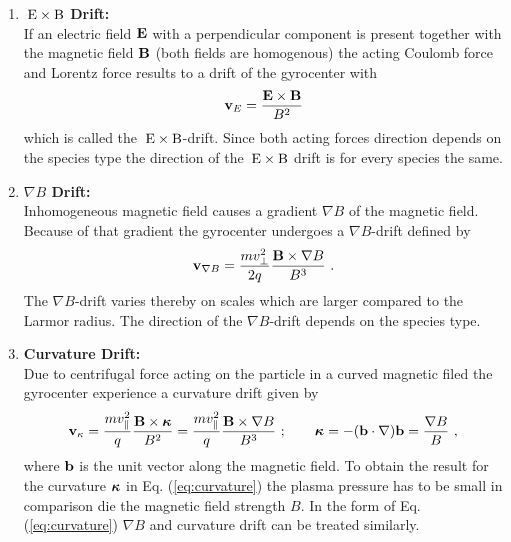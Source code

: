 \begin{enumerate}
    \item \textbf{$\mathrm{\:E}\times\mathrm{B}$ Drift:}\\
    If an electric field $\boldsymbol{\mathbf{E}}$ with a perpendicular component is present together with the magnetic field $\boldsymbol{\mathbf{B}}$ (both fields are homogenous) the acting Coulomb force and Lorentz force results to a drift of the gyrocenter with
    \begin{gather}
        \boldsymbol{\mathbf{v}}_{E} = \frac{\boldsymbol{\mathbf{E}}\times\boldsymbol{\mathbf{B}}}{B^2}
        \label{eq:exb}
    \end{gather}
    which is called the $\mathrm{\:E}\times\mathrm{B}$-drift. Since both acting forces direction depends on the species type the direction of the $\mathrm{\:E}\times\mathrm{B}$ drift is for every species the same.
    \item \textbf{$\nabla B$ Drift:}\\
    Inhomogeneous magnetic field causes a gradient $\nabla B$ of the magnetic field. Because of that gradient the gyrocenter undergoes a $\nabla B$-drift defined by
    \begin{gather}
        \boldsymbol{\mathbf{v}}_{\nabla B} = \frac{m v^2_{\perp}}{2 q}\frac{\boldsymbol{\mathbf{B}}\times \nabla B}{B^3}~.
        \label{eq:gradB}
    \end{gather}
    The $\nabla B$-drift varies thereby on scales which are larger compared to the Larmor radius. The direction of the $\nabla B$-drift depends on the species type.
    \item \textbf{Curvature Drift:}\\
    Due to centrifugal force acting on the particle in a curved magnetic filed the gyrocenter experience a curvature drift given by
    \begin{gather}
        \boldsymbol{\mathbf{v}}_{\kappa} = \frac{m v^2_{\parallel}}{q}\frac{\boldsymbol{\mathbf{B}}\times \boldsymbol{\mathbf{\kappa}}}{B^2} = \frac{m v^2_{\parallel}}{q} \frac{\boldsymbol{\mathbf{B}}\times \nabla B}{B^3}~;\qquad\boldsymbol{\mathbf{\kappa}} = -(\boldsymbol{\mathbf{b}}\cdot \nabla)\boldsymbol{\mathbf{b}} = \frac{\nabla B}{B}~,
        \label{eq:curvature}
    \end{gather}
    where $\boldsymbol{\mathbf{b}}$ is the unit vector along the magnetic field. To obtain the result for the curvature $\boldsymbol{\mathbf{\kappa}}$ in Eq. (\ref{eq:curvature}) the plasma pressure has to be small in comparison die the magnetic field strength $B$. In the form of Eq. (\ref{eq:curvature}) $\nabla B$ and curvature drift can be treated similarly. \cite{Wesson2011}
\end{enumerate}


